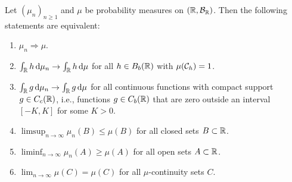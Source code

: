 \begin{theorem}\label{thm:portmanteau}
Let $(\mu_n)_{n \ge 1}$ and $\mu$ be probability measures on $(\mathbb R, \mathcal B_{\mathbb R})$. Then the following statements are equivalent:
\begin{enumerate}[label={(\arabic*)}]
\item $\mu_n \Rightarrow \mu$.
\item $\int_{\mathbb R} h \, \mathrm{d} \mu_n \to \int_{\mathbb R} h \, \mathrm{d} \mu$ for all $h\in B_b(\mathbb R)$ with $\mu(\mathcal C_h) = 1$.
\item $\int_{\mathbb R} g \, \mathrm{d} \mu_n \to \int_{\mathbb R} g \, \mathrm{d} \mu$ for all continuous functions with compact support $g\in C_c(\mathbb R)$, i.e., functions $g\in C_b(\mathbb R)$ that are zero outside an interval $[-K,K]$ for some $K > 0$.
\item $\limsup_{n \to \infty} \mu_n(B) \le \mu(B)$ for all closed sets $B \subset \mathbb R$.
\item $\liminf_{n \to \infty} \mu_n(A) \ge \mu(A)$ for all open sets $A \subset \mathbb R$.
\item $\lim_{n \to \infty} \mu(C) = \mu(C)$ for all $\mu$-continuity sets $C$.
\end{enumerate}
\end{theorem} 

